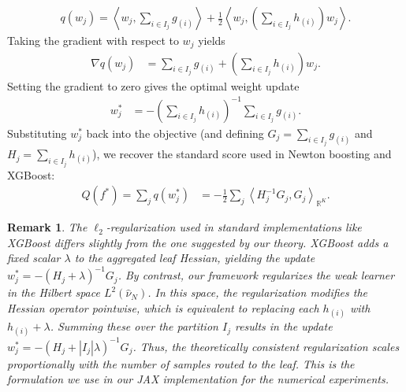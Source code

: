 \documentclass{article}
\theoremstyle{plain}
\newtheorem{remark}[theorem]{Remark} %
\theoremstyle{definition}
\theoremstyle{remark}
\begin{document}
\begin{align*}
    q(w_j) =  \left\langle w_j, \sum_{i \in I_j} g_{(i)} \right\rangle 
    + \frac{1}{2} \left\langle w_j, \left( \sum_{i \in I_j} h_{(i)} \right) w_j \right\rangle.
\end{align*}
Taking the gradient with respect to $w_j$ yields
\begin{align*}
    \nabla q(w_j)
    &= \sum_{i \in I_j} g_{(i)} + \left( \sum_{i \in I_j} h_{(i)} \right) w_j.
\end{align*}
Setting the gradient to zero gives the optimal weight update
\begin{align*}
    w_j^* &=  -\left( \sum_{i \in I_j} h_{(i)} \right)^{-1} \sum_{i \in I_j} g_{(i)}.
\end{align*}
Substituting $w_j^*$ back into the objective (and defining $G_j = \sum_{i \in I_j} g_{(i)}$ and $H_j = \sum_{i \in I_j} h_{(i)}$), we recover the standard score used in Newton boosting and XGBoost:
\begin{align*}
    Q(f^*) = \sum_j q(w_j^*) 
    &=  -\frac{1}{2} \sum_j \left\langle H_j^{-1} G_j , G_j \right\rangle_{\mathbb{R}^K}.
\end{align*}



\begin{remark}
    The $\ell_2$-regularization used in standard implementations like XGBoost differs slightly from the one suggested by our theory. XGBoost adds a fixed scalar $\lambda$ to the aggregated leaf Hessian, yielding the update $w_j^* = -(H_j + \lambda)^{-1} G_j$. By contrast, our framework regularizes the weak learner in the Hilbert space $L^2(\widehat{\nu}_N)$. In this space, the regularization modifies the Hessian operator pointwise, which is equivalent to replacing each $h_{(i)}$ with $h_{(i)} + \lambda$. Summing these over the partition $I_j$ results in the update $w_j^* = -(H_j + |I_j| \lambda)^{-1} G_j$. Thus, the theoretically consistent regularization scales proportionally with the number of samples routed to the leaf. This is the formulation we use in our JAX implementation for the numerical experiments.
\end{remark}
\end{document}
